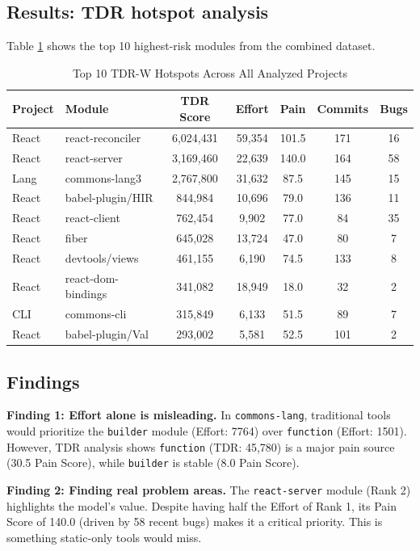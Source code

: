 \documentclass[journal]{IEEEtran}
\begin{document}
\subsection{Results: TDR hotspot analysis}
Table \ref{tab1} shows the top 10 highest-risk modules from the combined dataset.

\begin{table}[htbp]
\caption{Top 10 TDR-W Hotspots Across All Analyzed Projects}
\begin{center}
\begin{tabular}{|l|l|c|c|c|c|c|}
\hline
\textbf{Project} & \textbf{Module} & \textbf{TDR Score} & \textbf{Effort} & \textbf{Pain} & \textbf{Commits} & \textbf{Bugs} \\
\hline
React & react-reconciler & 6,024,431 & 59,354 & 101.5 & 171 & 16 \\
React & react-server & 3,169,460 & 22,639 & 140.0 & 164 & 58 \\
Lang & commons-lang3 & 2,767,800 & 31,632 & 87.5 & 145 & 15 \\
React & babel-plugin/HIR & 844,984 & 10,696 & 79.0 & 136 & 11 \\
React & react-client & 762,454 & 9,902 & 77.0 & 84 & 35 \\
React & fiber & 645,028 & 13,724 & 47.0 & 80 & 7 \\
React & devtools/views & 461,155 & 6,190 & 74.5 & 133 & 8 \\
React & react-dom-bindings & 341,082 & 18,949 & 18.0 & 32 & 2 \\
CLI & commons-cli & 315,849 & 6,133 & 51.5 & 89 & 7 \\
React & babel-plugin/Val & 293,002 & 5,581 & 52.5 & 101 & 2 \\
\hline
\end{tabular}
\label{tab1}
\end{center}
\end{table}

\subsection{Findings}
\textbf{Finding 1: Effort alone is misleading.} In \texttt{commons-lang}, traditional tools would prioritize the \texttt{builder} module (Effort: 7764) over \texttt{function} (Effort: 1501). However, TDR analysis shows \texttt{function} (TDR: 45,780) is a major pain source (30.5 Pain Score), while \texttt{builder} is stable (8.0 Pain Score).

\textbf{Finding 2: Finding real problem areas.} The \texttt{react-server} module (Rank 2) highlights the model's value. Despite having half the Effort of Rank 1, its Pain Score of 140.0 (driven by 58 recent bugs) makes it a critical priority. This is something static-only tools would miss.
\end{document}

